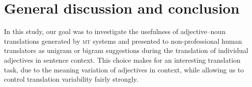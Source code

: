 \documentclass[output=paper]{LSP/langsci}
\begin{document}
\begin{comment}
\paragraph{Support Translations.} As can be seen from the last column of 
Table~\ref{tab:creative-translations}, we observe a high overall
quality of the the support suggestions, regardless of whether they were
effectively chosen as translations or not. These figures indicate that
arbitrarily selecting one of the support items extracted from phrase
table data already has a good chance to result in high translation
quality. In fact, our data suggests that there is no substantial
difference in performance between lay human translators acting without
any support (cf.\@ figure~\ref{fig:q-boxplot}; no support condition)
and an automatic system that always picks one support translation at
random. Note, however, that neither of these strategies can meet with
the translation quality achieved when human translators are provided
with phrase table support (cf.\@ figure~\ref{fig:q-boxplot};
unigram/bigram conditions). We suppose that this is due to the human
translators' capability of overriding suboptimal support suggestions
with a more appropriate creative translation if they feel the need. A
more thorough analysis of this aspect will be presented in the
following. %

\end{comment}





\section{General discussion and conclusion}
\label{sec:kremer:conlu}


In this study, our goal was to investigate the usefulness of
adjective--noun translations generated by \textsc{mt} systems and
presented to non-professional human translators as unigram or bigram
suggestions during the translation of individual adjectives in
sentence context. This choice makes for an interesting translation
task, due to the meaning variation of adjectives in context, while
allowing us to control translation variability fairly strongly.
\end{document}
